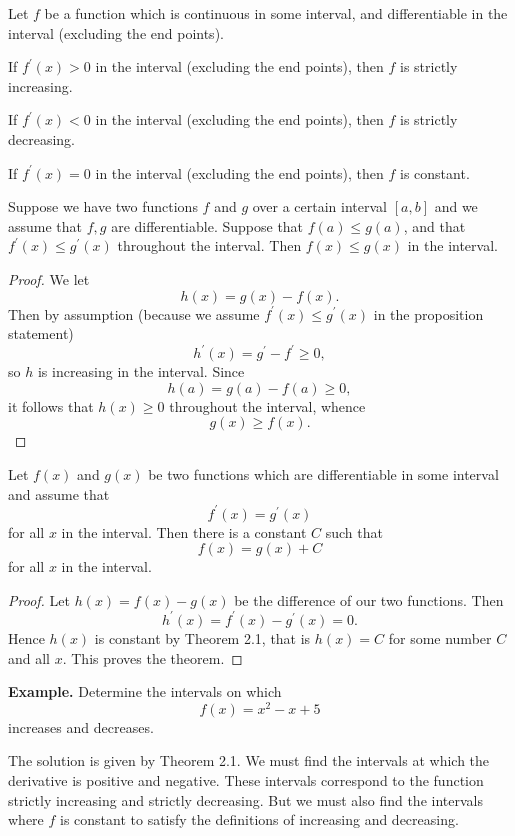 \begin{theorem}
  Let $f$ be a function which is continuous in some interval, and differentiable in the interval (excluding the end points).

  If $f^\prime(x) > 0$ in the interval (excluding the end points), then $f$ is strictly increasing.

  If $f^\prime(x) < 0$ in the interval (excluding the end points), then $f$ is strictly decreasing.

  If $f^\prime(x) = 0$ in the interval (excluding the end points), then $f$ is constant.
\end{theorem}

Suppose we have two functions $f$ and $g$ over a certain interval $[a,b]$ and we assume that $f,g$ are differentiable. Suppose that $f(a) \le g(a)$, and that $f^\prime(x) \le g^\prime(x)$ throughout the interval. Then $f(x) \le g(x)$ in the interval.

\begin{proof}
  We let
  \[h(x) = g(x) - f(x).\]
  Then by assumption (because we assume $f^\prime(x) \le g^\prime(x)$ in the proposition statement)
  \[h^\prime(x) = g^\prime - f^\prime \ge 0,\]
  so $h$ is increasing in the interval. Since
  \[h(a) = g(a) - f(a) \ge 0,\]
  it follows that $h(x) \ge 0$ throughout the interval, whence
  \[g(x) \ge f(x).\]
\end{proof}

\begin{theorem}
  Let $f(x)$ and $g(x)$ be two functions which are differentiable in some interval and assume that
  \[f^\prime(x) = g^\prime(x)\]
  for all $x$ in the interval. Then there is a constant $C$ such that
  \[f(x) = g(x) + C\]
  for all $x$ in the interval.
\end{theorem}

\begin{proof}
  Let $h(x) = f(x) - g(x)$ be the difference of our two functions. Then
  \[h^\prime(x) = f^\prime(x) - g^\prime(x) = 0.\]
  Hence $h(x)$ is constant by Theorem 2.1, that is $h(x) = C$ for some number $C$ and all $x$. This proves the theorem.
\end{proof}

\textbf{Example.} Determine the intervals on which
\[f(x) = x^2 - x + 5\]
increases and decreases.

The solution is given by Theorem 2.1. We must find the intervals at which the derivative is positive and negative. These intervals correspond to the function strictly increasing and strictly decreasing. But we must also find the intervals where $f$ is constant to satisfy the definitions of increasing and decreasing.

